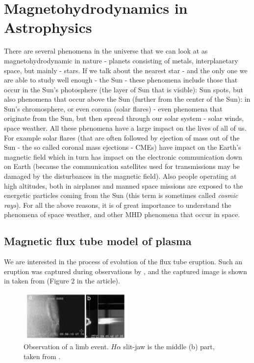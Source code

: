 \section{Magnetohydrodynamics in Astrophysics}
There are several phenomena in the universe that we can look at as magnetohydrodynamic in nature - planets consisting of metals, interplanetary space, but mainly - stars. If we talk about the nearest star - and the only one we are able to study well enough - the Sun - these phenomena include those that occur in the Sun's photosphere (the layer of Sun that is visible): Sun spots, but also phenomena that occur above the Sun (further from the center of the Sun): in Sun's chromosphere, or even corona (solar flares) - even phenomena that originate from the Sun, but then spread through our solar system - solar winds, space weather. All these phenomena have a large impact on the lives of all of us. For example solar flares (that are often followed by ejection of mass out of the Sun - the so called coronal mass ejections - CMEs) have impact on the Earth's magnetic field which in turn has impact on the electronic communication down on Earth (because the communication satellites used for transmissions may be damaged by the disturbances in the magnetic field). Also people operating at high altitudes, both in airplanes and manned space missions are exposed to the energetic particles coming from the Sun (this term is sometimes called \textit{cosmic rays}). For all the above reasons, it is of great importance to understand the phenomena of space weather, and other MHD phenomena that occur in space.


\subsection{Magnetic flux tube model of plasma}
We are interested in the process of evolution of the flux tube eruption. Such an eruption was captured during observations by \cite{miraClanek}, and the captured image is shown in  taken from \cite{miraClanek} (Figure 2 in the article).

\begin{figure}[H]
	\begin{center}
		\includegraphics[width=0.5\textwidth]{img/td-setup/figure2fromHalpha.jpg}
	\caption{Observation of a limb event. $H\alpha$ slit-jaw is the middle (b) part, taken from \cite{miraClanek}.}
	\label{figure:observation}
	\end{center}
\end{figure}

